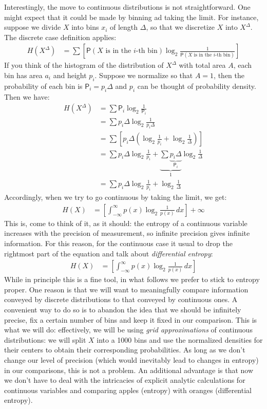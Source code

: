 \documentclass[
  10pt,
  dvipsnames,enabledeprecatedfontcommands]{scrartcl}
\begin{document}
Interestingly, the move to continuous distributions is not
straightforward. One might expect that it could be made by binning ad
taking the limit. For instance, suppose we divide \(X\) into bins
\(x_i\) of length \(\Delta\), so that we discretize \(X\) into
\(X^\Delta\). The discrete case definition applies: \begin{align*}
H(X^\Delta) & = \sum \left[\mathsf{P}(X \mbox{ is in the $i$-th bin}) \log_2 \frac{1}{\mathsf{P}(X \mbox{ is in the $i$-th bin})}\right]
\end{align*} \noindent If you think of the histogram of the distribution
of \(X^\Delta\) with total area \(A\), each bin has area \(a_i\) and
height \(p_i\). Suppose we normalize so that \(A =1\), then the
probability of each bin is \(\mathsf{P}_i = p_i \Delta\) and \(p_i\) can
be thought of probability density. Then we have: \begin{align*}
H(X^\Delta) & = \sum \mathsf{P}_i \log_2 \frac{1}{\mathsf{P}_i}\\
& = \sum p_i \Delta \log_2 \frac{1}{p_i \Delta}\\
& = \sum \left[ p_i \Delta \left(\log_2 \frac{1}{p_i} + \log_2\frac{1}{\Delta}\right)\right]\\
& = \sum p_i \Delta \log_2 \frac{1}{p_i} +    \underbrace{\sum \underbrace{p_i \Delta}_{\mathsf{P}_i}}_1 \log_2\frac{1}{\Delta} \\
& = \sum p_i \Delta \log_2 \frac{1}{p_i} +  \log_2\frac{1}{\Delta}
\end{align*} \noindent Accordingly, when we try to go continuous by
taking the limit, we get: \begin{align*}
H(X) & = \left[\int_{-\infty}^\infty p(x) \log_2 \frac{1}{p(x)}\, dx  \right] + \infty
\end{align*} \noindent This is, come to think of it, as it should: the
entropy of a continuous variable increases with the precision of
measurement, so infinite precision gives infinite information. For this
reason, for the continuous case it usual to drop the rightmost part of
the equation and talk about \emph{differential entropy}: \begin{align*}
H(X) & = \left[\int_{-\infty}^\infty p(x) \log_2 \frac{1}{p(x)}\, dx  \right] 
\end{align*} While in principle this is a fine tool, in what follows we
prefer to stick to entropy proper. One reason is that we will want to
meaningfully compare information conveyed by discrete distributions to
that conveyed by continuous ones. A convenient way to do so is to
abandon the idea that we should be infinitely precise, fix a certain
number of bins and keep it fixed in our comparison. This is what we will
do: effectively, we will be using \emph{grid approximations} of
continuous distributions: we will split \(X\) into a 1000 bins and use
the normalized densities for their centers to obtain their corresponding
probabilities. As long as we don't change our level of precision (which
would inevitably lead to changes in entropy) in our comparisons, this is
not a problem. An additional advantage is that now we don't have to deal
with the intricacies of explicit analytic calculations for continuous
variables and comparing apples (entropy) with oranges (differential
entropy).
\end{document}
